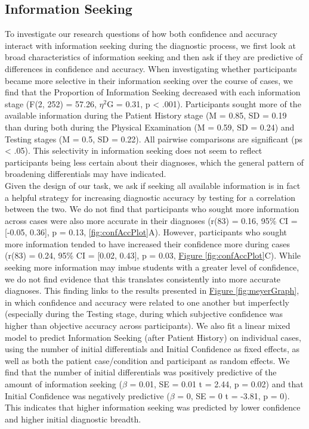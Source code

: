 \documentclass[a4paper, nobind]{templates/ociamthesis}
\begin{document}
\newpage

\subsection{Information Seeking}\label{information-seeking}

To investigate our research questions of how both confidence and accuracy interact with information seeking during the diagnostic process, we first look at broad characteristics of information seeking and then ask if they are predictive of differences in confidence and accuracy. When investigating whether participants became more selective in their information seeking over the course of cases, we find that the Proportion of Information Seeking decreased with each information stage (F(2, 252) = 57.26, \(\eta^2\)G = 0.31, p \textless{} .001). Participants sought more of the available information during the Patient History stage (M = 0.85, SD = 0.19 than during both during the Physical Examination (M = 0.59, SD = 0.24) and Testing stages (M = 0.5, SD = 0.22). All pairwise comparisons are significant (ps \textless{} .05). This selectivity in information seeking does not seem to reflect participants being less certain about their diagnoses, which the general pattern of broadening differentials may have indicated.\\

Given the design of our task, we ask if seeking all available information is in fact a helpful strategy for increasing diagnostic accuracy by testing for a correlation between the two. We do not find that participants who sought more information across cases were also more accurate in their diagnoses (r(83) = 0.16, 95\% CI = {[}-0.05, 0.36{]}, p = 0.13, \hyperref[fig:confAccPlot]{\ref{fig:confAccPlot}}A). However, participants who sought more information tended to have increased their confidence more during cases (r(83) = 0.24, 95\% CI = {[}0.02, 0.43{]}, p = 0.03, \hyperref[fig:confAccPlot]{Figure \ref{fig:confAccPlot}}C). While seeking more information may imbue students with a greater level of confidence, we do not find evidence that this translates consistently into more accurate diagnoses. This finding links to the results presented in \hyperref[fig:meyerGraph]{Figure \ref{fig:meyerGraph}}, in which confidence and accuracy were related to one another but imperfectly (especially during the Testing stage, during which subjective confidence was higher than objective accuracy across participants). We also fit a linear mixed model to predict Information Seeking (after Patient History) on individual cases, using the number of initial differentials and Initial Confidence as fixed effects, as well as both the patient case/condition and participant as random effects. We find that the number of initial differentials was positively predictive of the amount of information seeking (\(\beta\) = 0.01, SE = 0.01 t = 2.44, p = 0.02) and that Initial Confidence was negatively predictive (\(\beta\) = 0, SE = 0 t = -3.81, p = 0). This indicates that higher information seeking was predicted by lower confidence and higher initial diagnostic breadth.
\end{document}
